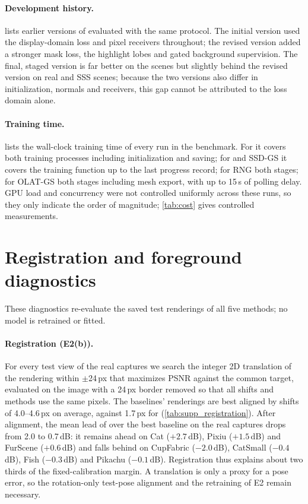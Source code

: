 \documentclass[10pt,twocolumn,letterpaper]{article}
\begin{document}
\paragraph{Development history.}
 lists earlier versions of \ours evaluated with the same protocol.
The initial version used the display-domain loss and pixel receivers throughout; the revised version added a stronger mask loss, the highlight lobes and gated background supervision.
The final, staged version is far better on the \gsthree scenes but slightly behind the revised version on real and SSS scenes; because the two versions also differ in initialization, normals and receivers, this gap cannot be attributed to the loss domain alone.



\paragraph{Training time.}
 lists the wall-clock training time of every run in the benchmark.
For \ours it covers both training processes including initialization and saving; for \gsthree and SSD-GS it covers the training function up to the last progress record; for RNG both stages; for OLAT-GS both stages including mesh export, with up to 15\,s of polling delay.
GPU load and concurrency were not controlled uniformly across these runs, so they only indicate the order of magnitude; \cref{tab:cost} gives controlled measurements.





\section{Registration and foreground diagnostics}
\label{sec:s_registration}
These diagnostics re-evaluate the saved test renderings of all five methods; no model is retrained or fitted.

\paragraph{Registration (E2(b)).}
For every test view of the real captures we search the integer 2D translation of the rendering within $\pm$24\,px that maximizes PSNR against the common target, evaluated on the image with a 24\,px border removed so that all shifts and methods use the same pixels.
The baselines' renderings are best aligned by shifts of 4.0--4.6\,px on average, against 1.7\,px for \ours (\cref{tab:supp_registration}).
After alignment, the mean lead of \ours over the best baseline on the real captures drops from 2.0 to 0.7\,dB: it remains ahead on Cat ($+2.7$\,dB), Pixiu ($+1.5$\,dB) and FurScene ($+0.6$\,dB) and falls behind on CupFabric ($-2.0$\,dB), CatSmall ($-0.4$\,dB), Fish ($-0.3$\,dB) and Pikachu ($-0.1$\,dB).
Registration thus explains about two thirds of the fixed-calibration margin. A translation is only a proxy for a pose error, so the rotation-only test-pose alignment and the retraining of E2 remain necessary.
\end{document}
